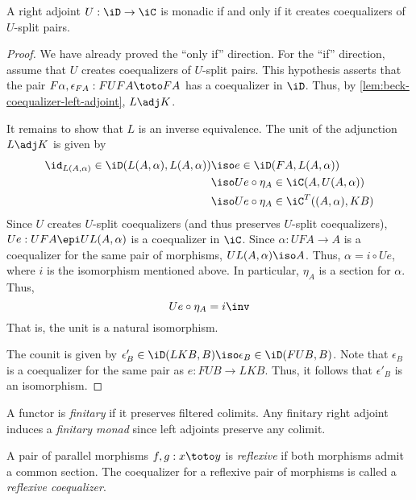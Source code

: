 \documentclass{amsart}
\begin{document}
\begin{thm}\label{thm:monadicity-theorem}
  A right adjoint $U : \iD \to \iC$ is monadic if and only if it creates coequalizers of $U$-split pairs.
\end{thm}
\begin{proof}
  We have already proved the ``only if'' direction.
  For the ``if'' direction, assume that $U$ creates coequalizers of $U$-split pairs.
  This hypothesis asserts that the pair $F\alpha,\epsilon_{FA} : FUFA \toto FA$ has a coequalizer in $\iD$.
  Thus, by \cref{lem:beck-coequalizer-left-adjoint}, $L \adj K$.

  It remains to show that $L$ is an inverse equivalence.
  The unit of the adjunction $L \adj K$ is given by
  \begin{align}
    \id_{L(A,\alpha)} \in \iD(L(A,\alpha), L(A,\alpha)) &\iso e \in \iD(FA, L(A,\alpha))\\
                                       &\iso Ue \circ \eta_{A} \in \iC(A,U(A,\alpha))\\
                                       &\iso Ue \circ \eta_{A} \in \iC^{T}((A,\alpha),KB)
  \end{align}
  Since $U$ creates $U$-split coequalizers (and thus preserves $U$-split coequalizers), $Ue : UFA \epi UL(A,\alpha)$ is a coequalizer in $\iC$.
  Since $\alpha : UFA \to A$ is a coequalizer for the same pair of morphisms, $UL(A,\alpha) \iso A$.
  Thus, $\alpha = i \circ Ue$, where $i$ is the isomorphism mentioned above.
  In particular, $\eta_{A}$ is a section for $\alpha$.
  Thus,
  \[
    Ue \circ \eta_{A} = i\inv
  \]
  That is, the unit is a natural isomorphism.

  The counit is given by $\epsilon'_{B} \in \iD(LKB, B) \iso \epsilon_{B} \in \iD(FUB,B)$.
  Note that $\epsilon_{B}$ is a coequalizer for the same pair as $e : FUB \to LKB$.
  Thus, it follows that $\epsilon'_{B}$ is an isomorphism.
  
\end{proof}

\begin{defn}
  A functor is \emph{finitary} if it preserves filtered colimits.
  Any finitary right adjoint induces a \emph{finitary monad} since left adjoints preserve any colimit.
\end{defn}

\begin{defn}
  A pair of parallel morphisms $f,g : x \toto y$ is \emph{reflexive} if both morphisms admit a common section.
  The coequalizer for a reflexive pair of morphisms is called a \emph{reflexive coequalizer}.
\end{defn}
\end{document}
